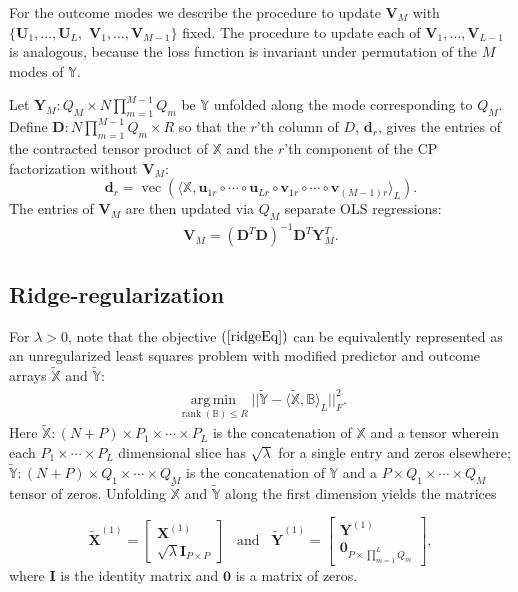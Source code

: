\documentclass[12pt]{article}
\def\ctimes{\times \cdots \times}
\def\Y{\mathbf{Y}}
\def\U{\mathbf{U}}
\def\u{\mathbf{u}}
\def\X{\mathbf{X}}
\def\XX{\mathbb{X}}
\def\YY{\mathbb{Y}}
\def\V{\mathbf{V}}
\def\BB{\mathbb{B}}
\def\d{\mathbf{d}}
\def\D{\mathbf{D}}
\def\v{\mathbf{v}}
\newcommand{\tprod}[3] {
  \langle #1, #2 \rangle_{#3}}
\DeclareMathOperator*{\amin}{arg\,min}
\def\argmin#1{\underset{#1}{\amin}}
\DeclareMathOperator*{\rank}{rank}
\DeclareMathOperator*{\vect}{vec}
\begin{document}
For the outcome modes we describe the procedure to update $\V_M$ with $\{\U_1,\hdots,\U_L,$ $\V_1,\hdots,\V_{M-1}\}$ fixed.  The procedure to update each of $\V_1,\hdots, \V_{L-1}$ is analogous, because the loss function is invariant under permutation of the $M$ modes of $\YY$. 

Let $\Y_M: Q_M \times N \prod_{m=1}^{M-1}Q_m$ be $\YY$ unfolded along the mode corresponding to $Q_M$.  Define $\D: N \prod_{m=1}^{M-1} Q_m  \times R$ so that the $r$'th column of $D$, $\d_r$, gives the entries of the contracted tensor product of $\XX$ and the $r$'th component of the CP factorization without $\V_M$:
\[\d_r = \vect \left( \tprod{\XX}{\u_{1r} \circ \cdots \circ \u_{Lr} \circ \v_{1r} \circ \cdots \circ \v_{(M-1) r}}{L} \right).\]   
The entries of $\V_{M}$ are then updated via $Q_M$ separate OLS regressions: 
\begin{align}
\V_M = (\D^T \D)^{-1} \D^T \Y_M^T.	\label{upV}	
\end{align}

\subsection{Ridge-regularization}
\label{ridgeAlg}
For $\lambda>0$, note that the objective $(\ref{ridgeEq})$ can be equivalently represented as an unregularized least squares problem with modified predictor and outcome arrays $\tilde{\XX}$ and $\tilde{\YY}$:
\begin{align*}
\argmin{\rank(\BB)\leq R} ||\tilde{\YY}- \tprod{\tilde{\XX}}{\BB}{L}||_F^2. \label{lsEqMod}	
\end{align*}
Here $\tilde{\XX}: \left(N + P \right) \times P_1 \ctimes P_L$ is the concatenation of $\XX$ and a tensor wherein each $P_1 \ctimes P_L$ dimensional slice has $\sqrt{\lambda}$ for a single entry and zeros elsewhere; $\tilde{\YY}: \left(N + P \right) \times Q_1 \ctimes Q_M$ is the concatenation of $\YY$ and a $P \times Q_1 \ctimes Q_M$ tensor of zeros.  Unfolding $\tilde{\XX}$ and $\tilde{\YY}$ along the first dimension yields the matrices 

\[\tilde{\X}^{(1)} =  \left[ \begin{array}{c}
\X^{(1)} \\
\sqrt{\lambda} \mathbf{I}_{P \times P} 
\end{array} \right] \, \, \, \text{ and } \, \, \, 
\tilde{\Y}^{(1)} =  \left[ \begin{array}{c}
\Y^{(1)} \\
\mathbf{0}_{P \times \prod_{m=1}^L Q_m} 
\end{array} \right],\]
where $\mathbf{I}$ is the identity matrix and $\mathbf{0}$ is a matrix of zeros.  
\end{document}
